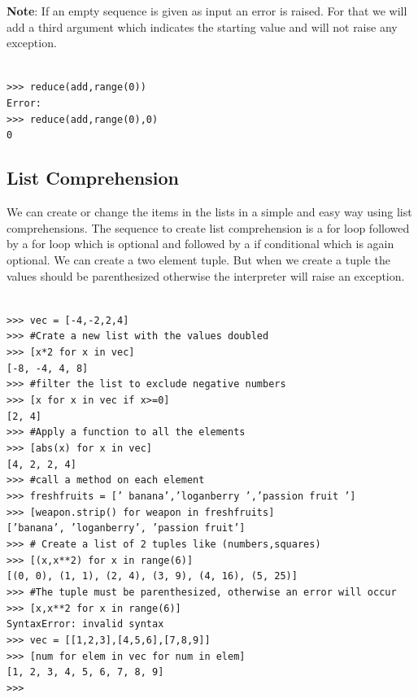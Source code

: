 \documentclass[12pt,a4paper]{article}
\begin{document}
\textbf{Note}: If an empty sequence is given as input an error is raised. For that we will add a third argument which indicates the starting value and will not raise any exception.

\texttt{\\
>>> reduce(add,range(0))\\
Error:\\
>>> reduce(add,range(0),0)\\
0}
\subsection{List Comprehension}
We can create or change the items in the lists in a simple and easy way using list comprehensions. The sequence to create list comprehension is a for loop followed by a for loop which is optional and followed by a if conditional which is again optional. We can create a two element tuple. But when we create a tuple the values should be parenthesized otherwise the interpreter will raise an exception.

\texttt{\\
>>> vec = [-4,-2,2,4]\\
>>> \#Crate a new list with the values doubled\\
>>> [x*2 for x in vec]\\
{[-8, -4, 4, 8]}\\
>>> \#filter the list to exclude negative numbers\\
>>> [x for x in vec if x>=0]\\
{[2, 4]}\\
>>> \#Apply a function to all the elements\\
>>> [abs(x) for x in vec]\\
{[4, 2, 2, 4]}\\
>>> \#call a method on each element\\
>>> freshfruits = ['  banana','loganberry  ','passion fruit  ']\\
>>> [weapon.strip() for weapon in freshfruits]\\
{['banana', 'loganberry', 'passion fruit']}\\
>>> \# Create a list of 2 tuples like (numbers,squares)\\
>>> [(x,x**2) for x in range(6)]\\
{[(0, 0), (1, 1), (2, 4), (3, 9), (4, 16), (5, 25)]}\\
>>> \#The tuple must be parenthesized, otherwise an error will occur\\
>>> [x,x**2 for x in range(6)]\\
SyntaxError: invalid syntax\\
>>> vec = [[1,2,3],[4,5,6],[7,8,9]]\\
>>> [num for elem in vec for num in elem]\\
{[1, 2, 3, 4, 5, 6, 7, 8, 9]}\\
>>> \\
}
\end{document}
